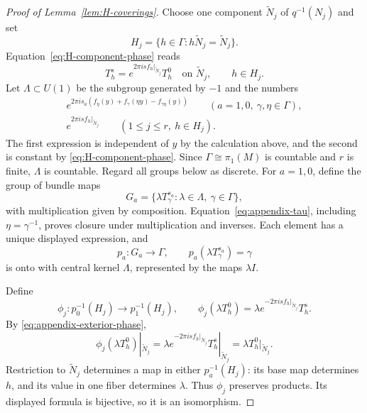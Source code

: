 \documentclass[12pt,reqno]{amsart}
\numberwithin{equation}{section}
\theoremstyle{definition}
\begin{document}
\begin{proof}[Proof of Lemma~\ref{lem:H-coverings}]
Choose one component $\widetilde N_j$ of $q^{-1}(N_j)$ and set
\[
 H_j=\{h\in\Gamma:h\widetilde N_j=\widetilde N_j\}.
\]
Equation~\eqref{eq:H-component-phase} reads
\begin{equation}\label{eq:appendix-exterior-phase}
 T_h^s=e^{2\pi isf_h|_{\widetilde N_j}}T_h^0
 \quad\text{on }\widetilde N_j,\qquad h\in H_j.
\end{equation}
Let $\Lambda\subset U(1)$ be the subgroup generated by $-1$ and
the numbers
\[
\begin{gathered}
 e^{2\pi i s_a(f_\eta(y)+f_\gamma(\eta y)-f_{\gamma\eta}(y))}
 \qquad(a=1,0,\ \gamma,\eta\in\Gamma),\\
 e^{2\pi isf_h|_{\widetilde N_j}}
 \qquad(1\leq j\leq r,\ h\in H_j).
\end{gathered}
\]
The first expression is independent of $y$ by the calculation above,
and the second is constant by \eqref{eq:H-component-phase}.
Since $\Gamma\cong\pi_1(M)$ is countable and $r$ is finite,
$\Lambda$ is countable. Regard all groups below as discrete.
For $a=1,0$, define the group of bundle maps
\[
 G_a=\{\lambda T^{s_a}_\gamma:\lambda\in\Lambda,\ \gamma\in\Gamma\},
\]
with multiplication given by composition.
Equation~\eqref{eq:appendix-tau}, including $\eta=\gamma^{-1}$,
proves closure under multiplication and inverses.
Each element has a unique displayed expression, and
\[
 p_a:G_a\longrightarrow\Gamma,\qquad
 p_a(\lambda T^{s_a}_\gamma)=\gamma
\]
is onto with central kernel $\Lambda$, represented by the maps $\lambda I$.

Define
\[
 \phi_j:p_0^{-1}(H_j)\longrightarrow p_1^{-1}(H_j),
 \qquad
 \phi_j(\lambda T_h^0)
 =\lambda e^{-2\pi isf_h|_{\widetilde N_j}}T_h^s.
\]
By \eqref{eq:appendix-exterior-phase},
\[
 \phi_j(\lambda T_h^0)|_{\widetilde N_j}
 =\lambda e^{-2\pi isf_h|_{\widetilde N_j}}
       T_h^s|_{\widetilde N_j}
 =\lambda T_h^0|_{\widetilde N_j}.
\]
Restriction to $\widetilde N_j$ determines a map in either
$p_a^{-1}(H_j)$: its base map determines $h$, and its value in one
fiber determines $\lambda$.
Thus $\phi_j$ preserves products. Its displayed formula is bijective,
so it is an isomorphism.


\end{proof}
\end{document}
